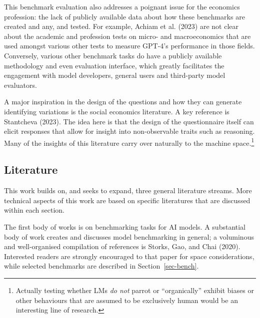 \documentclass[
]{article}
\begin{document}
This benchmark evaluation also addresses a poignant issue for the
economics profession: the lack of publicly available data about how
these benchmarks are created and any, and tested. For example, Achiam et
al. (2023) are not clear about the academic and profession tests on
micro- and macroeconomics that are used amongst various other tests to
measure GPT-4's performance in those fields. Conversely, various other
benchmark tasks do have a publicly available methodology and even
evaluation interface, which greatly facilitates the engagement with
model developers, general users and third-party model evaluators.

A major inspiration in the design of the questions and how they can
generate identifying variations is the social economics literature. A
key reference is Stantcheva (2023). The idea here is that the design of
the questionnaire itself can elicit responses that allow for insight
into non-observable traits such as reasoning. Many of the insights of
this literature carry over naturally to the machine space.\footnote{Actually
  testing whether LMs \emph{do not} parrot or ``organically'' exhibit
  biases or other behaviours that are assumed to be exclusively human
  would be an interesting line of research.}

\subsection{Literature}\label{literature}

This work builds on, and seeks to expand, three general literature
streams. More technical aspects of this work are based on specific
literatures that are discussed within each section.

The first body of works is on benchmarking tasks for AI models. A
substantial body of work creates and discusses model benchmarking in
general; a voluminous and well-organised compilation of references is
Storks, Gao, and Chai (2020). Interested readers are strongly encouraged
to that paper for space considerations, while selected benchmarks are
described in Section~\ref{sec-bench}.
\end{document}
